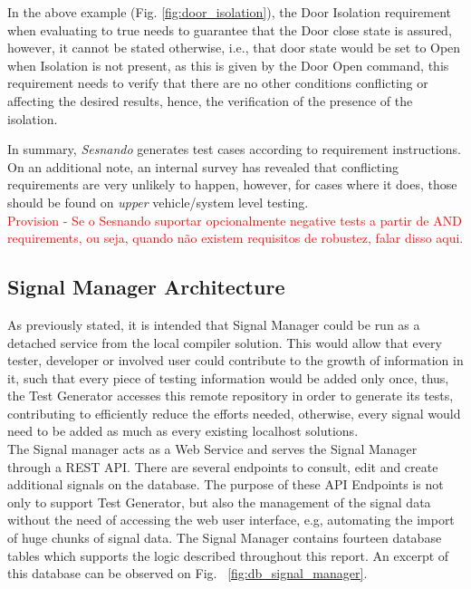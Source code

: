 In the above example (Fig. \ref{fig:door_isolation}), the Door Isolation requirement when evaluating to true needs to guarantee that the Door close state is assured, however, it cannot be stated otherwise, i.e., that door state would be set to Open when Isolation is not present, as this is given by the Door Open command, this requirement needs to verify that there are no other conditions conflicting or affecting the desired results, hence, the verification of the presence of the isolation.

In summary, \textit{Sesnando} generates test cases according to requirement instructions.\\

On an additional note, an internal survey has revealed that conflicting requirements are very unlikely to happen, however, for cases where it does, those should be found on \textit{upper} vehicle/system level testing.\\

\textcolor{red}{Provision - Se o Sesnando suportar opcionalmente negative tests a partir de AND requirements, ou seja, quando não existem requisitos de robustez, falar disso aqui.}\\


\subsection{Signal Manager Architecture}
\label{subsec:method_signal_manager}

As previously stated, it is intended that Signal Manager could be run as a detached service from the local compiler solution. This would allow that every tester, developer or involved user could contribute to the growth of information in it, such that every piece of testing information would be added only once, thus, the Test Generator accesses this remote repository in order to generate its tests, contributing to efficiently reduce the efforts needed, otherwise, every signal would need to be added as much as every existing localhost solutions.\\
The Signal manager acts as a Web Service and serves the Signal Manager through a REST API. There are several endpoints to consult, edit and create additional signals on the database. The purpose of these API Endpoints is not only to support Test Generator, but also the management of the signal data without the need of accessing the web user interface, e.g, automating the import of huge chunks of signal data. The Signal Manager contains fourteen database tables which supports the logic described throughout this report. An excerpt of this database can be observed on Fig. ~\ref{fig:db_signal_manager}.

